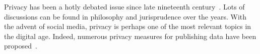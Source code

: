 

Privacy has been a hotly debated issue since late nineteenth
century~\cite{WB:90:RP}. Lots of discussions can be found in
philosophy and jurisprudence over the years. With the advent of social
media, privacy is perhaps one of the most relevant topics in the
digital age. Indeed, numerous privacy measures for publishing data
have been proposed~\cite{S:2002:KAMPP,FWC:10:PPDP}.








